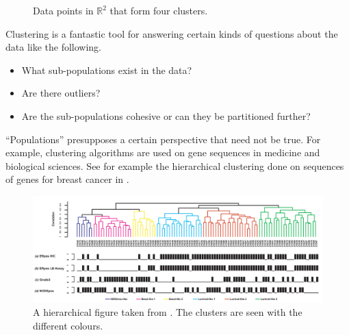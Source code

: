 \documentclass[a4paper, 12pt]{article}
\numberwithin{equation}{section}
\numberwithin{figure}{section}
\theoremstyle{definition}
\newcommand{\R}{\mathbb{R}}
\begin{document}
\begin{figure}
	\centering 
	\caption{Data points in $\R^2$ that form four clusters.}
	\label{fig:clusters}
\end{figure}

Clustering is a fantastic tool for answering certain kinds of questions about
the data like the following.
\begin{itemize}
	\item What sub-populations exist in the data? 
	\item Are there outliers? 
	\item Are the sub-populations cohesive or can they be partitioned further? 
\end{itemize}
``Populations'' presupposes a certain perspective that need not be true. For
example, clustering algorithms are used on gene sequences in medicine and
biological sciences. See for example the hierarchical clustering done on
sequences of genes for breast cancer in .

\begin{figure}[h]
	\centering
	\includegraphics[scale=0.4]{graphics/clustering-in-medicine.png}
	\caption{A hierarchical figure taken from \cite{BreastCancer}. The clusters are seen with the different colours.}
	\label{fig:clustering-genes}
\end{figure}
\end{document}
